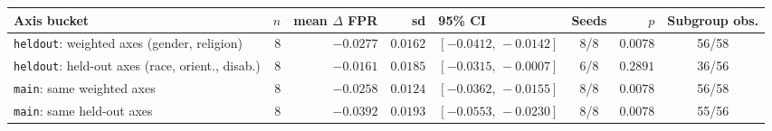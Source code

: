 \begin{tabular}{lrrrlcrc}
\toprule
Axis bucket & $n$ & mean $\Delta$ FPR & sd & 95\% CI & Seeds & $p$ & Subgroup obs. \\
\midrule
\texttt{heldout}: weighted axes (gender, religion) & 8 & $-0.0277$ & $0.0162$ & $[-0.0412,\,-0.0142]$ & 8/8 & $0.0078$ & 56/58 \\
\texttt{heldout}: held-out axes (race, orient., disab.) & 8 & $-0.0161$ & $0.0185$ & $[-0.0315,\,-0.0007]$ & 6/8 & $0.2891$ & 36/56 \\
\addlinespace
\texttt{main}: same weighted axes & 8 & $-0.0258$ & $0.0124$ & $[-0.0362,\,-0.0155]$ & 8/8 & $0.0078$ & 56/58 \\
\texttt{main}: same held-out axes & 8 & $-0.0392$ & $0.0193$ & $[-0.0553,\,-0.0230]$ & 8/8 & $0.0078$ & 55/56 \\
\bottomrule
\end{tabular}
